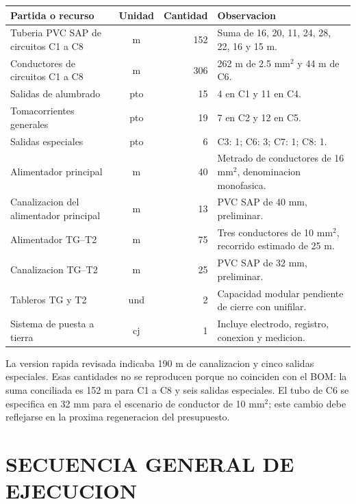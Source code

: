 \begin{center}
\small
\begin{tabularx}{\textwidth}{L c r L}
\toprule
\textbf{Partida o recurso} & \textbf{Unidad} & \textbf{Cantidad} & \textbf{Observacion} \\
\midrule
Tuberia PVC SAP de circuitos C1 a C8 & m & 152 & Suma de 16, 20, 11, 24, 28, 22, 16 y 15 m. \\
Conductores de circuitos C1 a C8 & m & 306 & 262 m de 2.5 mm\(^2\) y 44 m de C6. \\
Salidas de alumbrado & pto & 15 & 4 en C1 y 11 en C4. \\
Tomacorrientes generales & pto & 19 & 7 en C2 y 12 en C5. \\
Salidas especiales & pto & 6 & C3: 1; C6: 3; C7: 1; C8: 1. \\
Alimentador principal & m & 40 & Metrado de conductores de 16 mm\(^2\), denominacion monofasica. \\
Canalizacion del alimentador principal & m & 13 & PVC SAP de 40 mm, preliminar. \\
Alimentador TG--T2 & m & 75 & Tres conductores de 10 mm\(^2\), recorrido estimado de 25 m. \\
Canalizacion TG--T2 & m & 25 & PVC SAP de 32 mm, preliminar. \\
Tableros TG y T2 & und & 2 & Capacidad modular pendiente de cierre con unifilar. \\
Sistema de puesta a tierra & cj & 1 & Incluye electrodo, registro, conexion y medicion. \\
\bottomrule
\end{tabularx}
\end{center}

La version rapida revisada indicaba 190 m de canalizacion y cinco salidas especiales.
Esas cantidades no se reproducen porque no coinciden con el BOM: la suma conciliada es
152 m para C1 a C8 y seis salidas especiales. El tubo de C6 se especifica en 32 mm para
el escenario de conductor de 10 mm\(^2\); este cambio debe reflejarse en la proxima
regeneracion del presupuesto.

\section{SECUENCIA GENERAL DE EJECUCION}

